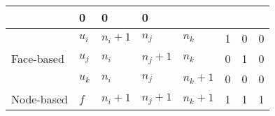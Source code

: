 \begin{large}
\begin{center}
\begin{tabular}{ l l|l|l|l|l|l|l|}
              &   0   &   0   &   0                        \\  %
  \hline      %
  \hline      %
  \multicolumn{1}{|l}{\multirow{3}{*}{\sf Face-based}}         %
      &   $u_i$                                                %
          &   $n_i+1$ &   $n_j$   &   $n_k$                    %
              &   1   &   0   &   0                        \\  %
  \cline{2-8} %
  \multicolumn{1}{|c}{}                                        %
      &   $u_j$                                                %
          &   $n_i$ &   $n_j+1$   &   $n_k$                    %
              &   0   &   1   &   0                        \\  %
  \cline{2-8} %
  \multicolumn{1}{|c}{}                                        %
      &   $u_k$                                                %
          &   $n_i$ &   $n_j$   &   $n_k+1$                    %
              &   0   &   0   &   0                        \\  %
  \hline      %
  \hline      %
  \multicolumn{1}{|l}{\sf Node-based}                          %
      &   $f$                                                  %
          &   $n_i+1$   &   $n_j+1$   &   $n_k+1$              %
              &   1   &   1   &   1                        \\  %
  \hline      %
  \hline      %

\end{tabular}
\end{center}
\end{large}
